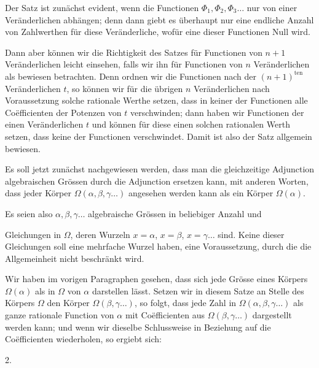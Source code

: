 Der Satz ist zunächst evident, wenn die Functionen $\Phi_1, \Phi_2, \Phi_3\ldots$ nur von einer Veränderlichen abhängen; denn dann giebt es überhaupt nur eine endliche Anzahl von Zahlwerthen für diese Veränderliche, wofür eine dieser Functionen Null wird.

Dann aber können wir die Richtigkeit des Satzes für Functionen von $n+1$ Veränderlichen leicht einsehen, falls wir ihn für Functionen von $n$ Veränderlichen als bewiesen betrachten. Denn ordnen wir die Functionen nach der $(n+1)^{\text{ten}}$ Veränderlichen $t$, so können wir für die übrigen $n$ Veränderlichen nach Voraussetzung solche rationale Werthe setzen, dass in keiner der Functionen alle Coëfficienten der Potenzen von $t$ verschwinden; dann haben wir Functionen der einen Veränderlichen $t$ und können für diese einen solchen rationalen Werth setzen, dass keine der Functionen verschwindet. Damit ist also der Satz allgemein bewiesen.

Es soll jetzt zunächst nachgewiesen werden, dass man die gleichzeitige Adjunction  algebraischen Grössen durch die Adjunction  ersetzen kann, mit anderen Worten, dass jeder Körper $\Omega(\alpha, \beta, \gamma\ldots)$ angesehen werden kann als ein Körper $\Omega(\alpha)$.

Es seien also $\alpha, \beta, \gamma\ldots$ algebraische Grössen in beliebiger Anzahl und


Gleichungen in $\Omega$, deren Wurzeln $x=\alpha$, $x=\beta$, $x=\gamma\ldots$ sind. Keine dieser Gleichungen soll eine mehrfache Wurzel haben, eine Voraussetzung, durch die die Allgemeinheit nicht beschränkt wird.

Wir haben im vorigen Paragraphen gesehen, dass sich jede Grösse eines Körpers $\Omega(\alpha)$ als  in $\Omega$ von $\alpha$ darstellen lässt. Setzen wir in diesem Satze an Stelle des Körpers $\Omega$ den Körper $\Omega(\beta, \gamma\ldots)$, so folgt, dass jede Zahl in $\Omega(\alpha, \beta, \gamma\ldots)$ als ganze rationale Function von $\alpha$ mit Coëfficienten aus $\Omega(\beta, \gamma\ldots)$ dargestellt werden kann; und wenn wir dieselbe Schlussweise in Beziehung auf die Coëfficienten wiederholen, so ergiebt sich:

2. 
